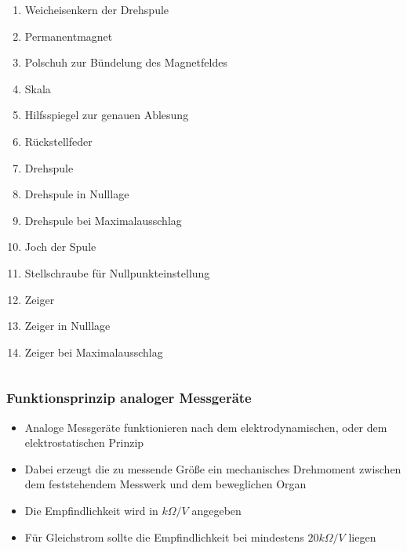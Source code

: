 \begin{frame}
\begin{columns}
    \begin{footnotesize}
      \begin{enumerate}
        \item Weicheisenkern der Drehspule
        \item Permanentmagnet
        \item Polschuh zur Bündelung des Magnetfeldes
        \item Skala
        \item Hilfsspiegel zur genauen Ablesung
        \item Rückstellfeder
        \item Drehspule
        \item Drehspule in Nulllage
        \item Drehspule bei Maximalausschlag
        \item Joch der Spule
        \item Stellschraube für Nullpunkteinstellung
        \item Zeiger
        \item Zeiger in Nulllage
        \item Zeiger bei Maximalausschlag
      \end{enumerate}
    \end{footnotesize}
  \end{columns}
\end{frame}

\begin{frame}
  \frametitle{Funktionsprinzip analoger Messgeräte}
  \begin{itemize}
    \item Analoge Messgeräte funktionieren nach dem elektrodynamischen, oder dem elektrostatischen Prinzip
    \item Dabei erzeugt die zu messende Größe ein mechanisches Drehmoment zwischen dem feststehendem Messwerk und dem beweglichen Organ
    \item Die Empfindlichkeit wird in $k \Omega /V$ angegeben
    \item Für Gleichstrom sollte die Empfindlichkeit bei mindestens $20 k \Omega / V$ liegen
  \end{itemize}
\end{frame}

